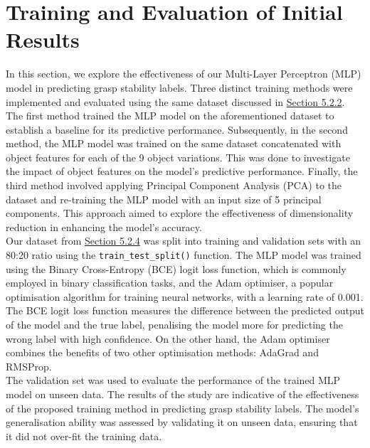 \documentclass[11pt, a4paper]{report}
\begin{document}
\section{Training and Evaluation of Initial Results}\label{sec:5.4}
In this section, we explore the effectiveness of our Multi-Layer Perceptron (MLP) model in predicting grasp stability labels. Three distinct training methods were implemented and evaluated using the same dataset discussed in \hyperref[sec:5.2.2]{Section 5.2.2}.\\

The first method trained the MLP model on the aforementioned dataset to establish a baseline for its predictive performance. Subsequently, in the second method, the MLP model was trained on the same dataset concatenated with object features for each of the 9 object variations. This was done to investigate the impact of object features on the model's predictive performance. Finally, the third method involved applying Principal Component Analysis (PCA) to the dataset and re-training the MLP model with an input size of 5 principal components. This approach aimed to explore the effectiveness of dimensionality reduction in enhancing the model's accuracy.\\

Our dataset from \hyperref[sec:5.2.4]{Section 5.2.4} was split into training and validation sets with an 80:20 ratio using the \verb|train_test_split()| function. The MLP model was trained using the Binary Cross-Entropy (BCE) logit loss function, which is commonly employed in binary classification tasks, and the Adam optimiser, a popular optimisation algorithm for training neural networks, with a learning rate of 0.001. The BCE logit loss function measures the difference between the predicted output of the model and the true label, penalising the model more for predicting the wrong label with high confidence. On the other hand, the Adam optimiser combines the benefits of two other optimisation methods: AdaGrad and RMSProp.\\

The validation set was used to evaluate the performance of the trained MLP model on unseen data. The results of the study are indicative of the effectiveness of the proposed training method in predicting grasp stability labels. The model's generalisation ability was assessed by validating it on unseen data, ensuring that it did not over-fit the training data.
\end{document}
